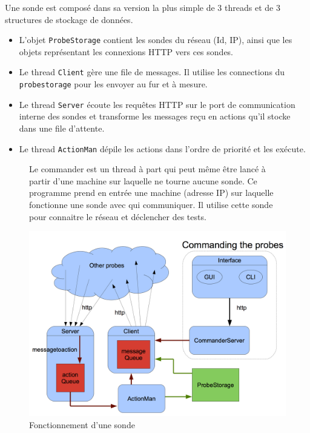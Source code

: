 \documentclass[a4paper,11pt]{article}
\newcommand{\cd}[1]{\texttt{#1}}
\begin{document}
Une sonde est composé dans sa version la plus simple de 3 threads et de 3 structures de stockage de données.
\begin{itemize}
\item L'objet \cd{ProbeStorage} contient les sondes du réseau (Id, IP), ainsi que les objets représentant les connexions HTTP vers ces sondes.
\item Le thread \cd{Client} gère une file de messages. Il utilise les connections du \cd{probestorage} pour les envoyer au fur et à mesure.
\item Le thread \cd{Server} écoute les requêtes HTTP sur le port de communication interne des sondes et transforme les messages reçu en actions qu'il stocke dans une file d'attente.
\item Le thread \cd{ActionMan} dépile les actions dans l'ordre de priorité et les exécute.
\end{itemize}
\begin{figure}[!ht]
\begin{minipage}[c]{0.3\linewidth}

Le commander est un thread à part qui peut même être lancé à partir d'une machine sur laquelle ne tourne aucune sonde. Ce programme prend en entrée une machine (adresse IP) sur laquelle fonctionne une sonde avec qui communiquer. Il utilise cette sonde pour connaitre le réseau et déclencher des tests.
\end{minipage}
\hfill
\begin{minipage}[c]{0.7\linewidth}

\centering\includegraphics[width=\linewidth]{img/graphCommander.png}
\caption{Fonctionnement d'une sonde}
\end{minipage}
\end{figure}
\FloatBarrier
\end{document}
